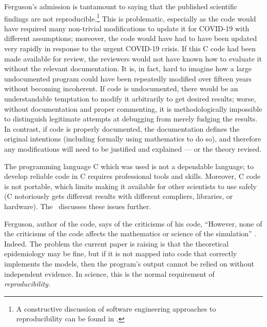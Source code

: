 Ferguson's admission is tantamount to saying that the published scientific findings are not reproducible.\footnote{A constructive discussion of software engineering approaches to reproducibility can be found in \cite{basic-reproducibilty}.} This is problematic, especially as the code would have required many non-trivial modifications to update it for COVID-19 with different assumptions; moreover, the code would have had to have been updated very rapidly in response to the urgent COVID-19 crisis. If this C code had been made available for review, the reviewers would not have known how to evaluate it without the relevant documentation. It is, in fact, hard to imagine how a large undocumented program could have been repeatedly modified over fifteen years without becoming incoherent. If code is undocumented, there would be an understandable temptation to modify it arbitrarily to get desired results; worse, without documentation and proper commenting, it is methodologically impossible to distinguish legitimate attempts at debugging from merely fudging the results. In contrast, if code is properly documented, the documentation defines the original intentions (including formally using mathematics to do so), and therefore any modifications will need to be justified and explained --- or the theory revised.

The programming language C which was used is not a dependable language; to develop reliable code in C requires professional tools and skills. Moreover, C code is not portable, which limits making it available for other scientists to use safely (C notoriously gets different results with different compliers, libraries, or hardware). The \supplement\ discusses these issues further.

Ferguson, author of the code, says of the criticisms of his code, ``However, none of the criticisms of the code affects the mathematics or science of the simulation'' \cite{thumbs-up}. Indeed. The problem the current paper is raising is that the theoretical epidemiology may be fine, but if it is not mapped into code that correctly implements the models, then the program's output cannot be relied on without independent evidence. In science, this is the normal requirement of \emph{reproducibility}.

